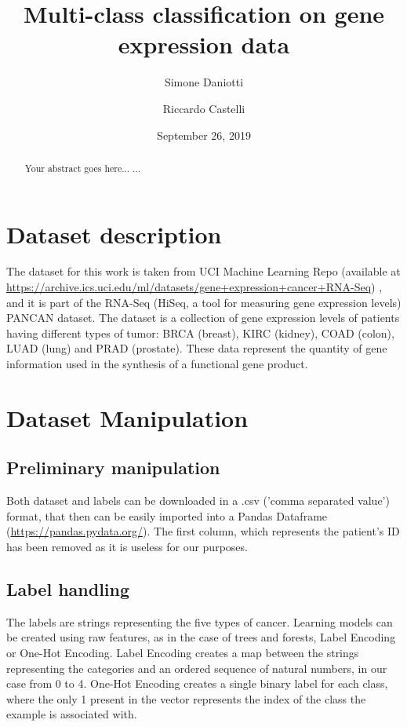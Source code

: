 \documentclass[12pt]{article}
\title{Multi-class classification on gene expression data}
\author[1]{Simone Daniotti}
\author[2]{Riccardo Castelli}
\affil[1]{Physics Department, University of Milan}
\affil[2]{Informatics Department, University of Milan}
\date{September 26, 2019}                     %
\begin{document}
 \maketitle
  

\begin{abstract}
Your abstract goes here...
...
\end{abstract}



\tableofcontents
\newpage


\section{Dataset description}

The dataset for this work is taken from UCI Machine Learning Repo (available at \url{https://archive.ics.uci.edu/ml/datasets/gene+expression+cancer+RNA-Seq}) \cite{Dua:2019}, and it is part of the RNA-Seq (HiSeq, a tool for measuring gene expression levels) PANCAN dataset. The dataset is a collection of gene expression levels of patients having different types of tumor: BRCA (breast), KIRC (kidney), COAD (colon), LUAD (lung) and PRAD (prostate).
These data represent the quantity of gene information used in the synthesis of a functional gene product. 


\section{Dataset Manipulation}


\subsection{Preliminary manipulation}
Both dataset and labels can be downloaded in a .csv ('comma separated value') format, that then can be easily imported into a Pandas Dataframe (\url{https://pandas.pydata.org/}). The first column, which represents the patient's ID has been removed as it is useless for our purposes.


\subsection{Label handling}
The labels are strings representing the five types of cancer. Learning models can be created using raw features, as in the case of trees and forests, Label Encoding or One-Hot Encoding.
Label Encoding creates a map between the strings representing the categories and an ordered sequence of natural numbers, in our case from 0 to 4.
One-Hot Encoding creates a single binary label for each class, where the only 1 present in the vector represents the index of the class the example is associated with.  
\end{document}
